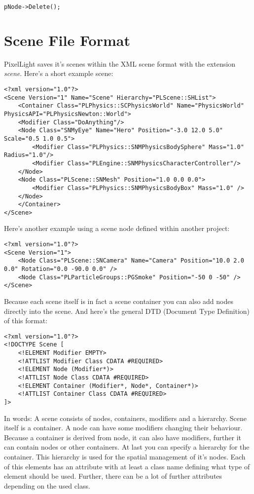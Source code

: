 \begin{lstlisting}[caption=Delete a scene node]
pNode->Delete();
\end{lstlisting}




\section{Scene File Format}
PixelLight saves it's scenes within the \ac{XML} scene format with the extension \emph{scene}. Here's a short example scene:

\begin{lstlisting}[caption=Scene file example]
<?xml version="1.0"?>
<Scene Version="1" Name="Scene" Hierarchy="PLScene::SHList">
	<Container Class="PLPhysics::SCPhysicsWorld" Name="PhysicsWorld" PhysicsAPI="PLPhysicsNewton::World">
	<Modifier Class="DoAnything"/>
	<Node Class="SNMyEye" Name="Hero" Position="-3.0 12.0 5.0" Scale="0.5 1.0 0.5">
		<Modifier Class="PLPhysics::SNMPhysicsBodySphere" Mass="1.0" Radius="1.0"/>
		<Modifier Class="PLEngine::SNMPhysicsCharacterController"/>
	</Node>
	<Node Class="PLScene::SNMesh" Position="1.0 0.0 0.0">
		<Modifier Class="PLPhysics::SNMPhysicsBodyBox" Mass="1.0" />
	</Node>
	</Container>
</Scene>
\end{lstlisting}

Here's another example using a scene node defined within another project:

\begin{lstlisting}[caption=Another scene file example]
<?xml version="1.0"?>
<Scene Version="1">
	<Node Class="PLScene::SNCamera" Name="Camera" Position="10.0 2.0 0.0" Rotation="0.0 -90.0 0.0" />
	<Node Class="PLParticleGroups::PGSmoke" Position="-50 0 -50" />
</Scene>
\end{lstlisting}

Because each scene itself is in fact a scene container you can also add nodes directly into the scene. And here's the general DTD (Document Type Definition) of this format:

\begin{lstlisting}[caption=Scene file format DTD]
<?xml version="1.0"?>
<!DOCTYPE Scene [
	<!ELEMENT Modifier EMPTY>
	<!ATTLIST Modifier Class CDATA #REQUIRED>
	<!ELEMENT Node (Modifier*)>
	<!ATTLIST Node Class CDATA #REQUIRED>
	<!ELEMENT Container (Modifier*, Node*, Container*)>
	<!ATTLIST Container Class CDATA #REQUIRED>
]>
\end{lstlisting}

In words: A scene consists of nodes, containers, modifiers and a hierarchy. Scene itself is a container. A node can have some modifiers changing their behaviour. Because a container is derived from node, it can also have modifiers, further it can contain nodes or other containers. At last you can specify a hierarchy for the container. This hierarchy is used for the spatial management of it's nodes. Each of this elements has an attribute with at least a class name defining what type of element should be used. Further, there can be a lot of further attributes depending on the used class.





